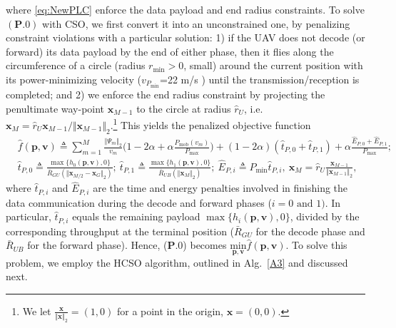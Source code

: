 \documentclass[12pt, draftcls, onecolumn]{IEEEtran}
\theoremstyle{plain}
\theoremstyle{definition}
\theoremstyle{remark}
\begin{document}
where \ref{eq:NewPLC} enforce the data payload and end radius constraints. 
To solve $(\mathbf{P.0})$ with CSO, we first convert it into an unconstrained one,  by penalizing constraint violations with a particular solution: 1) if the UAV does not decode (or forward) its data payload by the end of either phase, then it flies along the circumference of a circle (radius $r_{\mathrm{min}}{>}0$, small) around the current position with its power-minimizing velocity ($v_{P_{\mathrm{min}}}${=}22 m/s \cite{SCA}) until the transmission/reception is completed; and 2) we enforce the end radius constraint
by projecting the penultimate way-point $\mathbf{x}_{M{-}1}$ to the circle at radius $\hat{r}_{U}$, i.e.
$\mathbf x_M=\hat r_U\mathbf{x}_{M{-}1}/\Vert\mathbf{x}_{M{-}1}\Vert_2$.\footnote{We let $\frac{\mathbf{x}}{\Vert\mathbf{x}\Vert_{2}}{=}(1,0)$ for a point in the origin, $\mathbf{x}{=}(0,0)$.}
This yields the penalized objective function
\begin{align*}
    &\hat{f}(\mathbf{p},\mathbf{v}){\triangleq}\sum_{m{=}1}^{M}\frac{\Vert\Psi_{m}\Vert_{2}}{v_{m}}\Big(1-2\alpha+\alpha \frac{P_{\mathrm{mob}}(v_m)}{P_{\max}}\Big){+}(1-2\alpha)(\hat{t}_{P,0}{+}\hat{t}_{P,1}){+}\alpha \frac{\hat{E}_{P,0}{+}\hat{E}_{P,1}}{P_{\max}};\nonumber\\
    &\hat{t}_{P,0}{\triangleq}\frac{\max\{h_{0}(\mathbf{p},\mathbf{v}),0\}}{\bar{R}_{GU}(\Vert\mathbf{x}_{M/2}-\mathbf{x}_{G}\Vert_{2})};\ 
    \hat{t}_{P,1}{\triangleq}\frac{\max\{h_{1}(\mathbf{p},\mathbf{v}),0\}}{\bar{R}_{UB}(\Vert\mathbf{x}_{M}\Vert_{2})};\ \hat{E}_{P,i}{\triangleq}
    P_{\min}\hat{t}_{P,i},
    \ \mathbf x_M=\hat r_U\frac{\mathbf{x}_{M{-}1}}{\Vert\mathbf{x}_{M{-}1}\Vert_2},
\end{align*}
where $\hat{t}_{P,i}$ and $\hat{E}_{P,i}$ are the time and energy penalties involved in finishing the data communication during the decode and forward phases ($i{=}0\text{ and }1)$. 
In particular, $\hat{t}_{P,i}$ equals the remaining payload
$\max\{h_{i}(\mathbf{p},\mathbf{v}),0\}$, divided by the
corresponding throughput at the terminal position ($\bar R_{GU}$ for the decode phase and $\bar R_{UB}$ for the forward phase). Hence, ($\mathbf{P.0}$) becomes $\underset{\mathbf{p},\mathbf{v}}{\mathrm{min}}\hat{f}(\mathbf{p},\mathbf{v})$. To solve this problem, we employ the HCSO algorithm, outlined in Alg.~\ref{A3} and discussed next.
\end{document}
